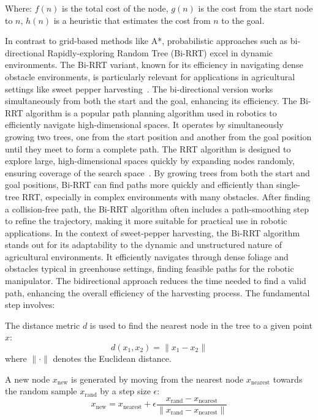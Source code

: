 \documentclass[a4paper,fleqn]{cas-dc}
\begin{document}
Where:
$f(n)$ is the total cost of the node, 
$g(n)$ is the cost from the start node to $n$, 
$h(n)$ is a heuristic that estimates the cost from $n$ to the goal.

In contrast to grid-based methods like A*, probabilistic approaches such as bi-directional Rapidly-exploring Random Tree (Bi-RRT) excel in dynamic environments. The Bi-RRT variant, known for its efficiency in navigating dense obstacle environments, is particularly relevant for applications in agricultural settings like sweet pepper harvesting~\cite {bac2016analysis}. The bi-directional version works simultaneously from both the start and the goal, enhancing its efficiency. 
The Bi-RRT algorithm is a popular path planning algorithm used in robotics to efficiently navigate high-dimensional spaces. It operates by simultaneously growing two trees, one from the start position and another from the goal position until they meet to form a complete path.
The RRT algorithm is designed to explore large, high-dimensional spaces quickly by expanding nodes randomly, ensuring coverage of the search space~\cite{lavalle1998rapidly}.
By growing trees from both the start and goal positions, Bi-RRT can find paths more quickly and efficiently than single-tree RRT, especially in complex environments with many obstacles.
After finding a collision-free path, the Bi-RRT algorithm often includes a path-smoothing step to refine the trajectory, making it more suitable for practical use in robotic applications.
In the context of sweet-pepper harvesting, the Bi-RRT algorithm stands out for its adaptability to the dynamic and unstructured nature of agricultural environments. It efficiently navigates through dense foliage and obstacles typical in greenhouse settings, finding feasible paths for the robotic manipulator. The bidirectional approach reduces the time needed to find a valid path, enhancing the overall efficiency of the harvesting process.
The fundamental step involves:

The distance metric \( d \) is used to find the nearest node in the tree to a given point \( x \):
\begin{equation}
d(x_1, x_2) = \| x_1 - x_2 \|
\end{equation}
where \( \| \cdot \| \) denotes the Euclidean distance.

A new node \( x_{\text{new}} \) is generated by moving from the nearest node \( x_{\text{nearest}} \) towards the random sample \( x_{\text{rand}} \) by a step size \( \epsilon \):
\begin{equation}
x_{\text{new}} = x_{\text{nearest}} + \epsilon \frac{x_{\text{rand}} - x_{\text{nearest}}}{\| x_{\text{rand}} - x_{\text{nearest}} \|}
\end{equation}
\end{document}
